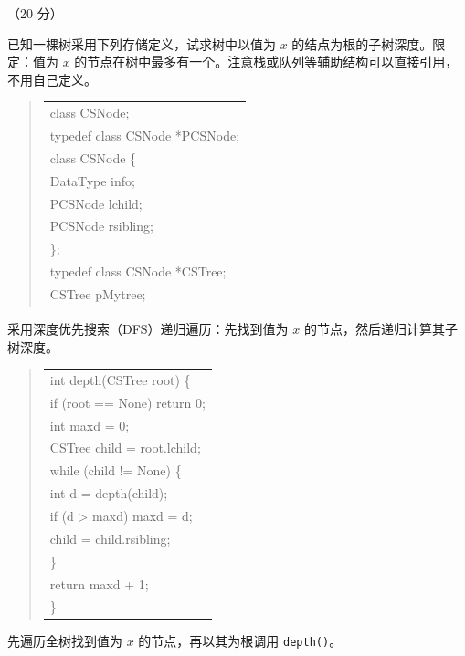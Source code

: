\begin{question}[求子树深度]（20 分）

已知一棵树采用下列存储定义，试求树中以值为 $x$ 的结点为根的子树深度。限定：值为 $x$ 的节点在树中最多有一个。注意栈或队列等辅助结构可以直接引用，不用自己定义。

\begin{quote}
\footnotesize
\begin{tabular}{@{}l@{}}
class CSNode;\\
typedef class CSNode *PCSNode;\\
class CSNode \{\\
    DataType info;\\
    PCSNode lchild;\\
    PCSNode rsibling;\\
\};\\
typedef class CSNode *CSTree;\\
CSTree pMytree;\\
\end{tabular}
\end{quote}

\begin{solution}
采用深度优先搜索（DFS）递归遍历：先找到值为 $x$ 的节点，然后递归计算其子树深度。
\begin{quote}
\footnotesize
\begin{tabular}{@{}l@{}}
int depth(CSTree root) \{\\
    if (root == None) return 0;\\
    int maxd = 0;\\
    CSTree child = root.lchild;\\
    while (child != None) \{\\
        int d = depth(child);\\
        if (d > maxd) maxd = d;\\
        child = child.rsibling;\\
    \}\\
    return maxd + 1;\\
\}\\
\end{tabular}
\end{quote}
先遍历全树找到值为 $x$ 的节点，再以其为根调用 \texttt{depth()}。
\end{solution}
\end{question}

\clearpage
